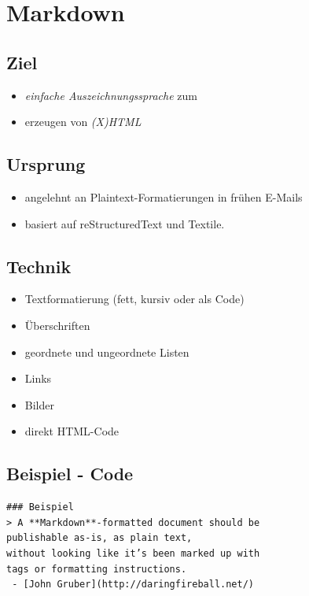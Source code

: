 \section{Markdown}

\subsection{Ziel}

\begin{itemize}
\item
  \emph{einfache Auszeichnungssprache} zum
\item
  erzeugen von \emph{(X)HTML}
\end{itemize}

\subsection{Ursprung}

\begin{itemize}
\item
  angelehnt an Plaintext-Formatierungen in frühen E-Mails
\item
  basiert auf reStructuredText und Textile.
\end{itemize}

\subsection{Technik}

\begin{itemize}
\item
  Textformatierung (fett, kursiv oder als Code)
\item
  Überschriften
\item
  geordnete und ungeordnete Listen
\item
  Links
\item
  Bilder
\item
  direkt HTML-Code
\end{itemize}

\subsection{Beispiel - Code}

\begin{verbatim}
### Beispiel
> A **Markdown**-formatted document should be
publishable as-is, as plain text, 
without looking like it’s been marked up with 
tags or formatting instructions.
 - [John Gruber](http://daringfireball.net/)
\end{verbatim}

